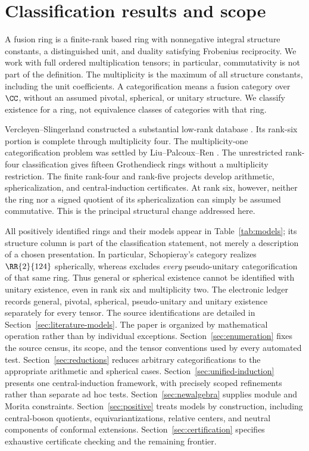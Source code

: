 \section{Classification results and scope}\label{sec:results}
A fusion ring is a finite-rank based ring with nonnegative integral
structure constants, a distinguished unit, and duality satisfying
Frobenius reciprocity. We work with full ordered multiplication tensors;
in particular, commutativity is not part of the definition.
The multiplicity is the maximum of all structure constants, including
the unit coefficients. A categorification means a fusion category over
$\CC$, without an assumed pivotal, spherical, or unitary structure.
We classify existence for a ring, not equivalence classes of categories
with that ring.

Vercleyen--Slingerland constructed a substantial low-rank database
\cite{VS}. Its rank-six portion is complete through multiplicity four.
The multiplicity-one categorification problem was settled by
Liu--Palcoux--Ren \cite{LPR}. The unrestricted rank-four classification
\cite{Rank4General} gives fifteen Grothendieck rings without a multiplicity
restriction. The finite rank-four and rank-five projects
\cite{DP4,DP5} develop arithmetic, sphericalization, and central-induction
certificates. At rank six, however, neither the ring nor a signed quotient
of its sphericalization can simply be assumed commutative. This is the
principal structural change addressed here.


All positively identified rings and their models appear in
Table~\ref{tab:models}; its structure column is part of the classification
statement, not merely a description of a chosen presentation. In
particular, Schopieray's category \cite[Example~1]{SchNonPU} realizes
$\RR{2}{124}$ spherically, whereas \cite[Theorem~1]{SchNonPU} excludes
\emph{every} pseudo-unitary categorification of that same ring.
Thus general or spherical existence cannot be identified with unitary
existence, even in rank six and multiplicity two. The electronic ledger
records general, pivotal, spherical, pseudo-unitary and unitary existence
separately for every tensor. The source identifications are detailed in Section~\ref{sec:literature-models}.
The paper is organized by mathematical operation rather than by individual
exceptions. Section~\ref{sec:enumeration} fixes the source census, its scope, and
the tensor conventions used by every automated test. Section~\ref{sec:reductions} reduces arbitrary
categorifications to the appropriate arithmetic and spherical cases.
Section~\ref{sec:unified-induction} presents one central-induction framework,
with precisely scoped refinements rather than separate ad hoc tests.
Section~\ref{sec:newalgebra} supplies module and Morita constraints.
Section~\ref{sec:positive} treats models by construction, including
central-boson quotients, equivariantizations, relative centers, and
neutral components of conformal extensions.
Section~\ref{sec:certification} specifies exhaustive certificate checking
and the remaining frontier.


